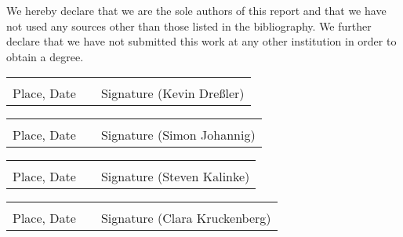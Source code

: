 
We hereby declare that we are the sole authors of this report and that we have not used any sources other than those listed in the bibliography. We further declare that we have not submitted this work at any other institution in order to obtain a degree.

\begin{tabular}{lp{2em}l} 
	\hspace{5cm}	&& \hspace{5cm} \\\cline{1-1}\cline{3-3}
	Place, Date		&& Signature (Kevin Dreßler) 
\end{tabular}

\begin{tabular}{lp{2em}l} 
	\hspace{5cm}	&& \hspace{5cm} \\\cline{1-1}\cline{3-3}
	Place, Date		&& Signature (Simon Johannig) 
\end{tabular}

\begin{tabular}{lp{2em}l} 
	\hspace{5cm}	&& \hspace{5cm} \\\cline{1-1}\cline{3-3}
	Place, Date		&& Signature (Steven Kalinke) 
\end{tabular}

\begin{tabular}{lp{2em}l} 
	\hspace{5cm}	&& \hspace{5cm} \\\cline{1-1}\cline{3-3}
	Place, Date		&& Signature (Clara Kruckenberg) 
\end{tabular}